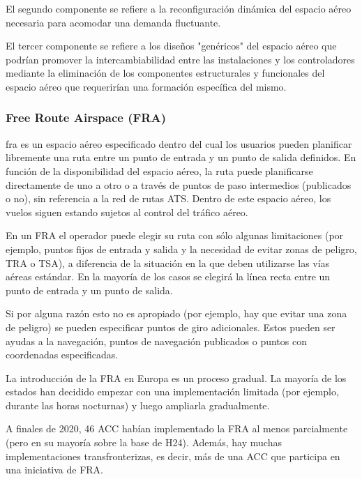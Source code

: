 El segundo componente se refiere a la reconfiguración dinámica del espacio aéreo necesaria para acomodar una demanda fluctuante. 

El tercer componente se refiere a los diseños "genéricos" del espacio aéreo que podrían promover la intercambiabilidad entre las instalaciones y los controladores mediante la eliminación de los componentes estructurales y funcionales del espacio aéreo que requerirían una formación específica del mismo.

\subsubsection{Free Route Airspace (FRA)}

\acrfull{fra} es un espacio aéreo especificado dentro del cual los usuarios pueden planificar libremente una ruta entre un punto de entrada y un punto de salida definidos. En función de la disponibilidad del espacio aéreo, la ruta puede planificarse directamente de uno a otro o a través de puntos de paso intermedios (publicados o no), sin referencia a la red de rutas ATS. Dentro de este espacio aéreo, los vuelos siguen estando sujetos al control del tráfico aéreo.

En un FRA el operador puede elegir su ruta con sólo algunas limitaciones (por ejemplo, puntos fijos de entrada y salida y la necesidad de evitar zonas de peligro, TRA o TSA), a diferencia de la situación en la que deben utilizarse las vías aéreas estándar. En la mayoría de los casos se elegirá la línea recta entre un punto de entrada y un punto de salida. 

Si por alguna razón esto no es apropiado (por ejemplo, hay que evitar una zona de peligro) se pueden especificar puntos de giro adicionales. Estos pueden ser ayudas a la navegación, puntos de navegación publicados o puntos con coordenadas especificadas.

La introducción de la FRA en Europa es un proceso gradual. La mayoría de los estados han decidido empezar con una implementación limitada (por ejemplo, durante las horas nocturnas) y luego ampliarla gradualmente.

A finales de 2020, 46 ACC habían implementado la FRA al menos parcialmente (pero en su mayoría sobre la base de H24). Además, hay muchas implementaciones transfronterizas, es decir, más de una ACC que participa en una iniciativa de FRA.